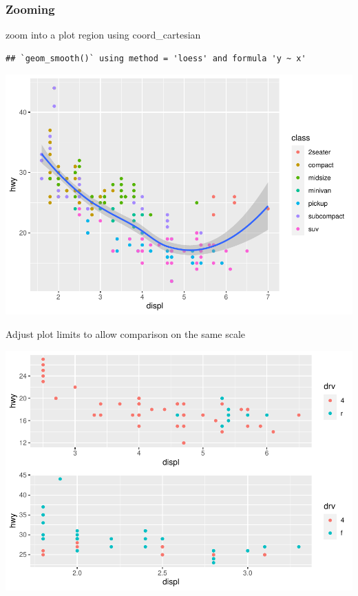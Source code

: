 \documentclass[
]{article}
\begin{document}
\hypertarget{zooming}{%
\subsubsection{Zooming}\label{zooming}}

zoom into a plot region using coord\_cartesian

\begin{verbatim}
## `geom_smooth()` using method = 'loess' and formula 'y ~ x'
\end{verbatim}

\includegraphics{rmarkdown_tutorial_files/figure-latex/unnamed-chunk-29-1.pdf}

Adjust plot limits to allow comparison on the same scale

\includegraphics{rmarkdown_tutorial_files/figure-latex/unnamed-chunk-30-1.pdf}
\end{document}
